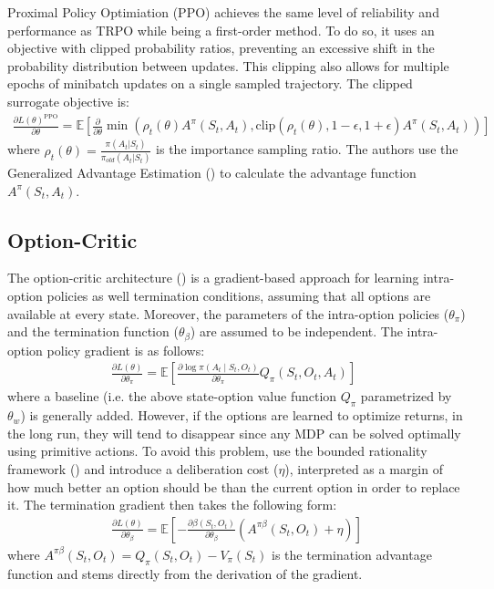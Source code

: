 \documentclass{article}
\def\given{\middle\vert}
\def\expectation{\mathbb{E}}
\newcommand{\deriv}[2][]{\frac{\partial#1}{\partial#2}}
\def\State{S}
\def\Action{A}
\def\Option{O}
\begin{document}
Proximal Policy Optimiation (PPO) achieves the same level of reliability and performance as TRPO while being a first-order method. To do so, it uses an objective with clipped probability ratios, preventing an excessive shift in the probability distribution between updates. This clipping also allows for multiple epochs of minibatch updates on a single sampled trajectory. The clipped surrogate objective is:
\begin{align*}
  \deriv[L(\theta)^{\text{PPO}}]{\theta}  = \expectation\left[\deriv[]{\theta} \min( \rho_t(\theta) A^{\pi}(S_t, A_t), \text{clip}(\rho_t(\theta), 1 - \epsilon, 1+ \epsilon) A^{\pi}(S_t, A_t))\right]
\end{align*}
where $\rho_t(\theta) = \frac{\pi(A_t | S_t)}{\pi_{{old}}(A_t | S_t)}$ is the importance sampling ratio. The authors use the Generalized Advantage Estimation (\cite{SchulmanMLJA15}) to calculate the advantage function $A^{\pi}(S_t, A_t)$.
\vspace*{-8pt}

\subsection{Option-Critic}
\vspace*{-8pt}

The option-critic architecture (\cite{Bacon2017}) is a gradient-based approach for learning intra-option policies as well termination conditions, assuming that all options are available at every state. Moreover, the parameters of the intra-option policies ($\theta_{\pi}$) and the termination function ($\theta_{\beta}$)  are assumed to be independent. The intra-option policy gradient is as follows:
\begin{align*}
    \deriv[L(\theta)]{\theta_\pi} =  \expectation\left[ \deriv[\log \pi\left(\Action_t \given \State_t,\Option_t\right)]{\theta_\pi} Q_\pi(\State_t,\Option_t, \Action_t)\right] \enspace 
\end{align*}
where a baseline (i.e. the above state-option value function $Q_\pi $  parametrized by $\theta_w$) is generally added. However, if the options are learned to optimize returns, in the long run, they will tend to disappear since any MDP can be solved optimally using primitive actions. To avoid this problem, \cite{Harb2018} use the bounded rationality framework (\cite{Simon1969}) and introduce a deliberation cost ($\eta$), interpreted as  a margin of how much better an option should be than the current option in order to replace it. The termination gradient then takes the following form:
\begin{align*}
    \deriv[L(\theta)]{\theta_\beta} = \expectation\left[ -\deriv[\beta(\State_t, \Option_t)]{\theta_\beta} (A^{\pi \beta}(\State_t,\Option_t) + \eta) \right] 
\end{align*}
where $A^{\pi \beta}(\State_t,\Option_t) = Q_\pi(\State_t,\Option_t) - V_\pi(\State_t)$ is the termination advantage function and stems directly from the derivation of the gradient. 
\vspace*{-8pt}
\end{document}
